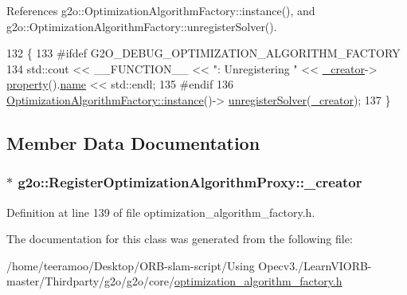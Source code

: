 References g2o\+::\+Optimization\+Algorithm\+Factory\+::instance(), and g2o\+::\+Optimization\+Algorithm\+Factory\+::unregister\+Solver().


\begin{DoxyCode}
132       \{
133 \textcolor{preprocessor}{#ifdef G2O\_DEBUG\_OPTIMIZATION\_ALGORITHM\_FACTORY}
134         std::cout << \_\_FUNCTION\_\_ << \textcolor{stringliteral}{": Unregistering "} << \hyperlink{classg2o_1_1RegisterOptimizationAlgorithmProxy_a75e4119a0fdcfe4c4267cd86a90073d6}{\_creator}->
      \hyperlink{classg2o_1_1AbstractOptimizationAlgorithmCreator_af070d079a64f6d23afe6df25e154b160}{property}().\hyperlink{structg2o_1_1OptimizationAlgorithmProperty_aedb3c54122d6a75d49e1677e836bac22}{name} << std::endl;
135 \textcolor{preprocessor}{#endif}
136         \hyperlink{classg2o_1_1OptimizationAlgorithmFactory_a4fe827a82f01c74ef124e7a9a9c98707}{OptimizationAlgorithmFactory::instance}()->
      \hyperlink{classg2o_1_1OptimizationAlgorithmFactory_adf79430f6176c9e9309a703ba2dbd14b}{unregisterSolver}(\hyperlink{classg2o_1_1RegisterOptimizationAlgorithmProxy_a75e4119a0fdcfe4c4267cd86a90073d6}{\_creator});
137       \}
\end{DoxyCode}


\subsection{Member Data Documentation}
\subsubsection[{\texorpdfstring{\+\_\+creator}{_creator}}]{$\ast$ g2o\+::\+Register\+Optimization\+Algorithm\+Proxy\+::\+\_\+creator\hspace{0.3cm}{\ttfamily [private]}}\hypertarget{classg2o_1_1RegisterOptimizationAlgorithmProxy_a75e4119a0fdcfe4c4267cd86a90073d6}{}\label{classg2o_1_1RegisterOptimizationAlgorithmProxy_a75e4119a0fdcfe4c4267cd86a90073d6}


Definition at line 139 of file optimization\+\_\+algorithm\+\_\+factory.\+h.



The documentation for this class was generated from the following file\+:\begin{DoxyCompactItemize}
\item 
/home/teeramoo/\+Desktop/\+O\+R\+B-\/slam-\/script/\+Using Opecv3./\+Learn\+V\+I\+O\+R\+B-\/master/\+Thirdparty/g2o/g2o/core/\hyperlink{optimization__algorithm__factory_8h}{optimization\+\_\+algorithm\+\_\+factory.\+h}\end{DoxyCompactItemize}
